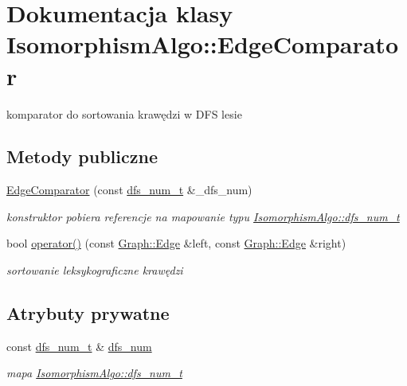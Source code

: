 \hypertarget{classIsomorphismAlgo_1_1EdgeComparator}{\section{Dokumentacja klasy Isomorphism\-Algo\-:\-:Edge\-Comparator}
\label{classIsomorphismAlgo_1_1EdgeComparator}
}


komparator do sortowania krawędzi w D\-F\-S lesie  


\subsection*{Metody publiczne}
\begin{DoxyCompactItemize}
\item 
\hyperlink{classIsomorphismAlgo_1_1EdgeComparator_a5b4469dad63a2ef7a25cefc15e7a2aad}{Edge\-Comparator} (const \hyperlink{classIsomorphismAlgo_a848c1d965a1c201d768513f756629bbe}{dfs\-\_\-num\-\_\-t} \&\-\_\-dfs\-\_\-num)
\begin{DoxyCompactList}\small\item\em konstruktor pobiera referencje na mapowanie typu \hyperlink{classIsomorphismAlgo_a848c1d965a1c201d768513f756629bbe}{Isomorphism\-Algo\-::dfs\-\_\-num\-\_\-t} \end{DoxyCompactList}\item 
bool \hyperlink{classIsomorphismAlgo_1_1EdgeComparator_ad208cca714eb330527241b39faf83c12}{operator()} (const \hyperlink{structGraph_1_1Edge}{Graph\-::\-Edge} \&left, const \hyperlink{structGraph_1_1Edge}{Graph\-::\-Edge} \&right)
\begin{DoxyCompactList}\small\item\em sortowanie leksykograficzne krawędzi \end{DoxyCompactList}\end{DoxyCompactItemize}
\subsection*{Atrybuty prywatne}
\begin{DoxyCompactItemize}
\item 
const \hyperlink{classIsomorphismAlgo_a848c1d965a1c201d768513f756629bbe}{dfs\-\_\-num\-\_\-t} \& \hyperlink{classIsomorphismAlgo_1_1EdgeComparator_a556adfa994a59c346150236ae0dce5c0}{dfs\-\_\-num}
\begin{DoxyCompactList}\small\item\em mapa \hyperlink{classIsomorphismAlgo_a848c1d965a1c201d768513f756629bbe}{Isomorphism\-Algo\-::dfs\-\_\-num\-\_\-t} \end{DoxyCompactList}\end{DoxyCompactItemize}


